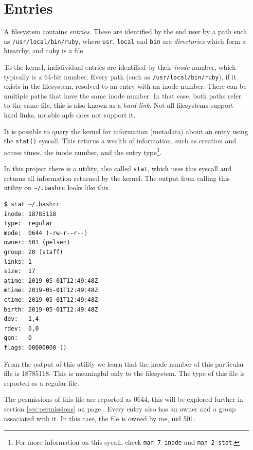 \documentclass[a4paper]{article}
\begin{document}
\section{Entries}

A filesystem contains \emph{entries}. These are identified by the end user by a path such as \verb|/usr/local/bin/ruby|, where \verb|usr|, \verb|local| and \verb|bin| are \emph{directories} which form a hiearchy, and \verb|ruby| is a file. 

To the kernel, indidividual entries are identified by their \emph{inode} number, which typically is a 64-bit number. Every path (such as \verb|/usr/local/bin/ruby|), if it exists in the filesystem, resolved to an entry with an inode number. There can be multiple paths that have the same inode number. In that case, both paths refer to the same file, this is also known as a \emph{hard link}. Not all filesystems support hard links, notable \gls{apfs} does not support it.


It is possible to query the kernel for information (metadata) about an entry using the \verb|stat()| syscall. This returns a wealth of information, such as creation and access times, the inode number, and the entry type\footnote{For more information on this sycall, check \texttt{man 7 inode} and \texttt{man 2 stat}.}. 

In this project there is a utility, also called \verb|stat|, which uses this syscall and returns all information returned by the kernel. The output from calling this utility on \verb|~/.bashrc| looks like this.

\begin{verbatim}
$ stat ~/.bashrc
inode: 18785118
type:  regular
mode:  0644 (-rw-r--r--)
owner: 501 (pelsen)
group: 20 (staff)
links: 1
size:  17
atime: 2019-05-01T12:49:48Z
mtime: 2019-05-01T12:49:48Z
ctime: 2019-05-01T12:49:48Z
birth: 2019-05-01T12:49:48Z
dev:   1,4
rdev:  0,0
gen:   0
flags: 00000000 ()
\end{verbatim}
From the output of this utility we learn that the inode number of this particular file is 18785118. This is meaningful only to the filesystem. The type of this file is reported as a regular file. 

The permissions of this file are reported as 0644, this will be explored further in section \ref{sec:permissions} on page \pageref{sec:permissions}. Every entry also has an owner and a group associated with it. In this case, the file is owned by me, \gls{uid} 501.
\end{document}
